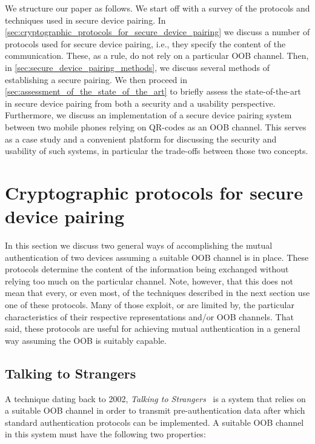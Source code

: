 \documentclass[conference, 11pt]{sty/IEEEtran}
\begin{document}
We structure our paper as follows.
We start off with a survey of the protocols and techniques used in secure device pairing.
In \autoref{sec:cryptographic_protocols_for_secure_device_pairing} we discuss a number of protocols used for secure device pairing, i.e., they specify the content of the communication.
These, as a rule, do not rely on a particular OOB channel.
Then, in \autoref{sec:secure_device_pairing_methods}, we discuss several methods of establishing a secure pairing.
We then proceed in \autoref{sec:assessment_of_the_state_of_the_art} to briefly assess the state-of-the-art in secure device pairing from both a security and a usability perspective.
Furthermore, we discuss an implementation of a secure device pairing system between two mobile phones relying on QR-codes as an OOB channel.
This serves as a case study and a convenient platform for discussing the security and usability of such systems, in particular the trade-offs between those two concepts.

\section{Cryptographic protocols for secure device pairing}
\label{sec:cryptographic_protocols_for_secure_device_pairing}

In this section we discuss two general ways of accomplishing the mutual authentication of two devices assuming a suitable OOB channel is in place.
These protocols determine the content of the information being exchanged without relying too much on the particular channel.
Note, however, that this does not mean that every, or even most, of the techniques described in the next section use one of these protocols.
Many of those exploit, or are limited by, the particular characteristics of their respective representations and/or OOB channels.
That said, these protocols are useful for achieving mutual authentication in a general way assuming the OOB is suitably capable.

\subsection{Talking to Strangers}
\label{ssec:talking_to_strangers}

A technique dating back to 2002, \emph{Talking to Strangers}~\cite{balfanz2002talking} is a system that relies on a suitable OOB channel in order to transmit pre-authentication data after which standard authentication protocols can be implemented.
A suitable OOB channel in this system must have the following two properties:
\end{document}
